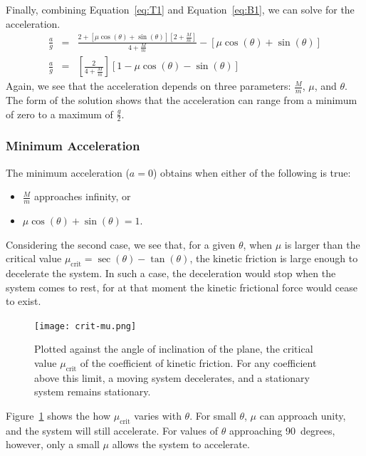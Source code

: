 \documentclass[twocolumn]{article}
\begin{document}
Finally, combining Equation~\ref{eq:T1} and Equation~\ref{eq:B1}, we can solve
for the acceleration.
\begin{eqnarray}
   \nonumber
   \tfrac{a}{g} &=& \frac{2 + [\mu \cos(\theta) + \sin(\theta)][2 +
                     \tfrac{M}{m}]}{4 + \tfrac{M}{m}} - [\mu \cos(\theta) +
                     \sin(\theta)]\\
   \tfrac{a}{g} &=& \left[ \frac{2}{4 + \tfrac{M}{m}} \right] [1 - \mu
                    \cos(\theta) - \sin(\theta)]
\end{eqnarray}
Again, we see that the acceleration depends on three parameters:
$\tfrac{M}{m}$, $\mu$, and $\theta$. The form of the solution shows that the
acceleration can range from a minimum of zero to a maximum of $\tfrac{g}{2}$.

\subsubsection{Minimum Acceleration}

The minimum acceleration ($a = 0$) obtains when either of the following is
true:
\begin{itemize}[noitemsep]
   \item $\tfrac{M}{m}$ approaches infinity, or
   \item $\mu \cos(\theta) + \sin(\theta) = 1$.
\end{itemize}
Considering the second case, we see that, for a given $\theta$, when $\mu$ is
larger than the critical value $\mu_\text{crit} = \sec(\theta) - \tan(\theta)$,
the kinetic friction is large enough to decelerate the system. In such a case,
the deceleration would stop when the system comes to rest, for at that moment
the kinetic frictional force would cease to exist.
\begin{figure}
   \begin{center}
      \texttt{[image: crit-mu.png]}
   \end{center}
   \caption{Plotted against the angle of inclination of the plane, the critical
   value $\mu_\text{crit}$ of the coefficient of kinetic friction. For any
   coefficient above this limit, a moving system decelerates, and a stationary
   system remains stationary.}
   \label{fig:mu-crit}
\end{figure}
Figure~\ref{fig:mu-crit} shows the how $\mu_\text{crit}$ varies with $\theta$.
For small $\theta$, $\mu$ can approach unity, and the system will still
accelerate. For values of $\theta$ approaching 90~degrees, however, only a
small $\mu$ allows the system to accelerate.
\end{document}
